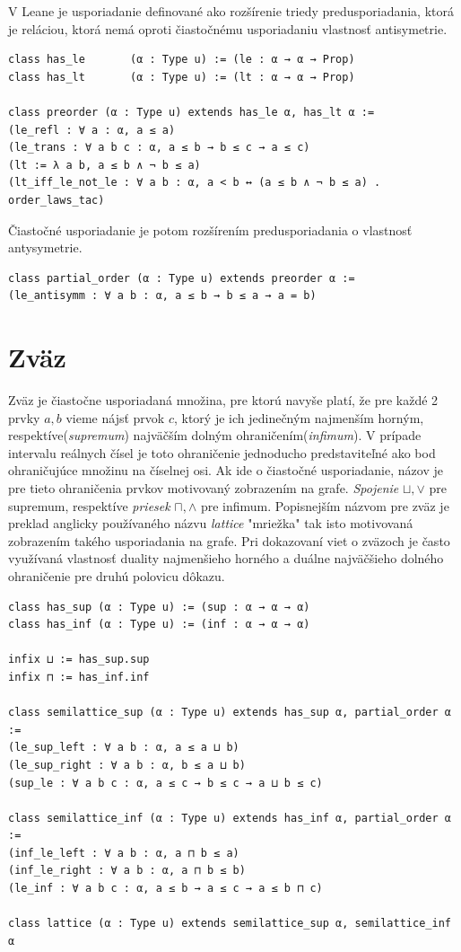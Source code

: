 \documentclass[a4paper,10pt,oneside]{report}%
\begin{document}
    V Leane je usporiadanie definované ako rozšírenie triedy predusporiadania, ktorá
je reláciou, ktorá nemá oproti čiastočnému usporiadaniu vlastnosť antisymetrie.

\begin{lstlisting}
class has_le       (α : Type u) := (le : α → α → Prop)
class has_lt       (α : Type u) := (lt : α → α → Prop)

class preorder (α : Type u) extends has_le α, has_lt α :=
(le_refl : ∀ a : α, a ≤ a)
(le_trans : ∀ a b c : α, a ≤ b → b ≤ c → a ≤ c)
(lt := λ a b, a ≤ b ∧ ¬ b ≤ a)
(lt_iff_le_not_le : ∀ a b : α, a < b ↔ (a ≤ b ∧ ¬ b ≤ a) . order_laws_tac)
\end{lstlisting}
    Čiastočné usporiadanie je potom rozšírením predusporiadania o vlastnosť antysymetrie.
\begin{lstlisting}
class partial_order (α : Type u) extends preorder α :=
(le_antisymm : ∀ a b : α, a ≤ b → b ≤ a → a = b)
\end{lstlisting}

\section{Zväz}
    Zväz je čiastočne usporiadaná množina, pre ktorú navyše platí, že pre každé 2 prvky $a, b$
vieme nájsť prvok $c$, ktorý je ich jedinečným najmenším horným, respektíve(\emph{supremum})
najväčším dolným ohraničením(\emph{infimum}).
    V prípade intervalu reálnych čísel je toto ohraničenie jednoducho predstaviteľné
ako bod ohraničujúce množinu na číselnej osi.
    Ak ide o čiastočné usporiadanie, názov je pre tieto ohraničenia prvkov
motivovaný zobrazením na grafe.
    \emph{Spojenie} $\sqcup, \vee$ pre supremum, respektíve \emph{priesek} $\sqcap, \wedge$ pre infimum.
    Popisnejším názvom pre zväz je preklad anglicky používaného názvu \emph{lattice}
"mriežka" tak isto motivovaná zobrazením takého usporiadania na grafe.
    Pri dokazovaní viet o zväzoch je často využívaná vlastnosť duality najmenšieho
horného a duálne najväčšieho dolného ohraničenie pre druhú polovicu dôkazu.
\begin{lstlisting}
class has_sup (α : Type u) := (sup : α → α → α)
class has_inf (α : Type u) := (inf : α → α → α)

infix ⊔ := has_sup.sup
infix ⊓ := has_inf.inf

class semilattice_sup (α : Type u) extends has_sup α, partial_order α :=
(le_sup_left : ∀ a b : α, a ≤ a ⊔ b)
(le_sup_right : ∀ a b : α, b ≤ a ⊔ b)
(sup_le : ∀ a b c : α, a ≤ c → b ≤ c → a ⊔ b ≤ c)

class semilattice_inf (α : Type u) extends has_inf α, partial_order α :=
(inf_le_left : ∀ a b : α, a ⊓ b ≤ a)
(inf_le_right : ∀ a b : α, a ⊓ b ≤ b)
(le_inf : ∀ a b c : α, a ≤ b → a ≤ c → a ≤ b ⊓ c)

class lattice (α : Type u) extends semilattice_sup α, semilattice_inf α
\end{lstlisting}
\end{document}
